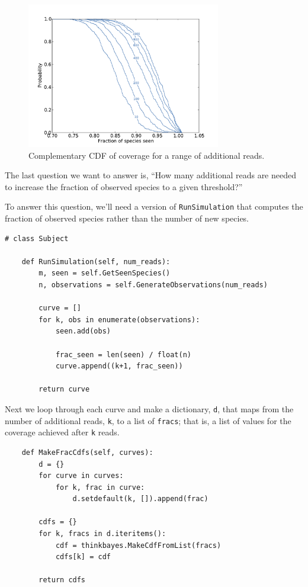 \documentclass[12pt]{book}
\begin{document}
\begin{figure}
\centerline{\includegraphics[height=2.5in]{figs/species-frac-B1242.pdf}}
\caption{Complementary CDF of coverage for a range of additional reads.}
\label{species-frac}
\end{figure}

The last question we want to answer is, ``How many additional reads
are needed to increase the fraction of observed species to a given
threshold?''

To answer this question, we'll need a version of {\tt RunSimulation}
that computes the fraction of observed species rather than the
number of new species.

\begin{verbatim}
# class Subject

    def RunSimulation(self, num_reads):
        m, seen = self.GetSeenSpecies()
        n, observations = self.GenerateObservations(num_reads)

        curve = []
        for k, obs in enumerate(observations):
            seen.add(obs)

            frac_seen = len(seen) / float(n)
            curve.append((k+1, frac_seen))

        return curve
\end{verbatim}

Next we loop through each curve and make a dictionary, {\tt d},
that maps from the number of additional reads, {\tt k}, to
a list of {\tt fracs}; that is, a list of values for the
coverage achieved after {\tt k} reads.

\begin{verbatim}
    def MakeFracCdfs(self, curves):
        d = {}
        for curve in curves:
            for k, frac in curve:
                d.setdefault(k, []).append(frac)

        cdfs = {}
        for k, fracs in d.iteritems():
            cdf = thinkbayes.MakeCdfFromList(fracs)
            cdfs[k] = cdf

        return cdfs
\end{verbatim}
\end{document}
